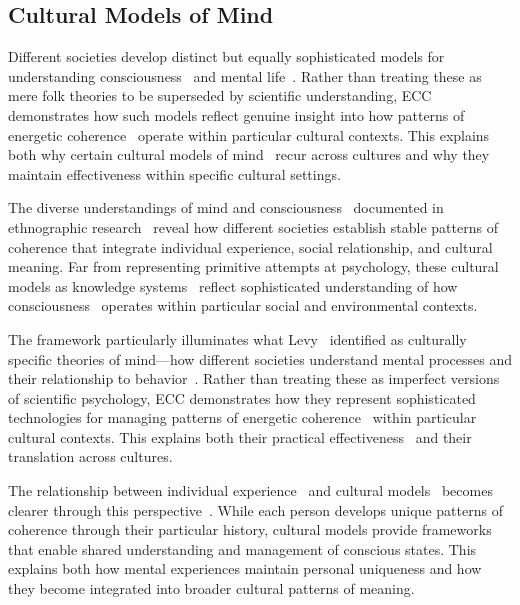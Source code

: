 \subsection*{Cultural Models of Mind}

Different societies develop distinct but equally sophisticated models for understanding consciousness~ and mental life~\cite{luhrmann2012when,shore1996culture}. Rather than treating these as mere folk theories to be superseded by scientific understanding, ECC demonstrates how such models reflect genuine insight into how patterns of energetic coherence~ operate within particular cultural contexts. This explains both why certain cultural models of mind~ recur across cultures and why they maintain effectiveness within specific cultural settings.

The diverse understandings of mind and consciousness~ documented in ethnographic research~\cite{hollan2000constructivist,bloch2012anthropology} reveal how different societies establish stable patterns of coherence that integrate individual experience, social relationship, and cultural meaning. Far from representing primitive attempts at psychology, these cultural models as knowledge systems~ reflect sophisticated understanding of how consciousness~ operates within particular social and environmental contexts.

The framework particularly illuminates what Levy~\cite{levy1973tahitians} identified as culturally specific theories of mind—how different societies understand mental processes and their relationship to behavior~\cite{dandrade1995development}. Rather than treating these as imperfect versions of scientific psychology, ECC demonstrates how they represent sophisticated technologies for managing patterns of energetic coherence~ within particular cultural contexts. This explains both their practical effectiveness~ and their translation across cultures.

The relationship between individual experience~ and cultural models~ becomes clearer through this perspective~\cite{white1994ethnopsychology,throop2003articulating}. While each person develops unique patterns of coherence through their particular history, cultural models provide frameworks that enable shared understanding and management of conscious states. This explains both how mental experiences maintain personal uniqueness and how they become integrated into broader cultural patterns of meaning.


